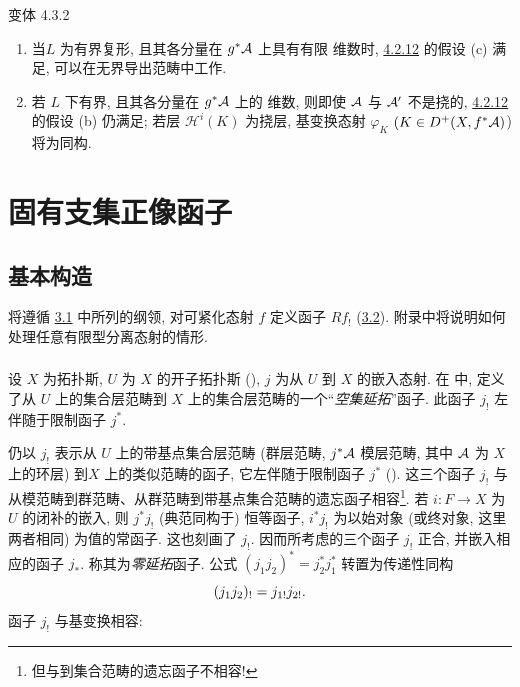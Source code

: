 \begin{enonce*}[remark]{变体 4.3.2}
\begin{enumerate}
\renewcommand{\theenumi}{\roman{enumi}}
\renewcommand{\labelenumi}{(\theenumi)}
\item 当\pageoriginale $L$ 为有界复形, 且其各分量在 $g^{\ast}{\mathcal A}$ 上具有有限 \tTor 维数时, \hyperref[XVII.subsubsec4.2.12]{4.2.12} 的假设 (c) 满足, 可以在无界导出范畴中工作.

\item 若 $L$ 下有界, 且其各分量在 $g^{\ast}{\mathcal A}$ 上的 \tTor 维数, 则即使 ${\mathcal A}$ 与 ${\mathcal A}'$ 不是挠的, \hyperref[XVII.subsubsec4.2.12]{4.2.12} 的假设 (b) 仍满足; 若层 $ℋ^{i}(K)$ 为挠层, 基变换态射 $\varphi_{K}$ $(K\in
D^{+}(X,f^{\ast}{\mathcal A})$) 将为同构.
\end{enumerate}
\end{enonce*}

\section{固有支集正像函子}

\subsection{基本构造}

将遵循 \hyperref[XVII.subsec3.1]{3.1} 中所列的纲领, 对可紧化态射 $f$ 定义函子 $Rf_{!}$ (\hyperref[XVII.subsec3.2]{3.2}). 附录中将说明如何处理任意有限型分离态射的情形.

\subsubsection{}

设 $X$ 为拓扑斯, $U$ 为 $X$ 的开子拓扑斯 (), $j$ 为从 $U$ 到 $X$ 的嵌入态射. 在  中, 定义了从 $U$ 上的集合层范畴到 $X$ 上的集合层范畴的一个“\emph{空集延拓}”函子. 此函子 $j_{!}$ 左伴随于限制函子 $j^{\ast}$.

仍以 $j_{!}$ 表示从 $U$ 上的带基点集合层范畴 (\resp 群层范畴, \resp $j^{\ast}{\mathcal A}$ 模层范畴, 其中 ${\mathcal A}$ 为 $X$ 上的环层) 到\pageoriginale $X$ 上的类似范畴的函子, 它左伴随于限制函子 $j^{\ast}$ (). 这三个函子 $j_{!}$ 与从模范畴到群范畴、从群范畴到带基点集合范畴的遗忘函子相容\footnote[1]{但与到集合范畴的遗忘函子不相容!
}. 若 $i:F\rightarrow X$ 为 $U$ 的闭补的嵌入, 则 $j^{\ast}j_{!}$ (典范同构于) 恒等函子, $i^{\ast}j_{!}$ 为以始对象 (或终对象, 这里两者相同) 为值的常函子. 这也刻画了 $j_{!}$. 因而所考虑的三个函子 $j_{!}$ 正合, 并嵌入相应的函子 $j_{\ast}$. 称其为\emph{零延拓}函子. 公式 $(j_1j_2)^{\ast}=j^{\ast}_2 j^{\ast}_1$ 转置为传递性同构
\[
(j_1 j_2)_{!}=j_{1!}j_{2!}{}.
\]
函子 $j_{!}$ 与基变换相容:


